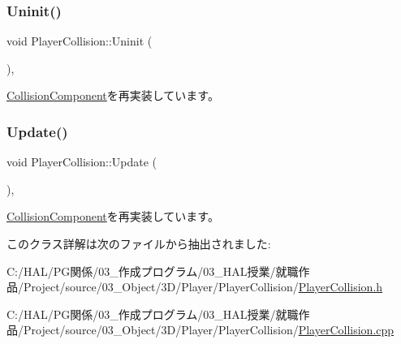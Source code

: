 \mbox{\label{class_player_collision_aa1ab60a62fa2ae3231a1ea0bc8faf801}} 
\subsubsection{\texorpdfstring{Uninit()}{Uninit()}}
{\footnotesize\ttfamily void Player\+Collision\+::\+Uninit (\begin{DoxyParamCaption}{ }\end{DoxyParamCaption})\hspace{0.3cm}{\ttfamily [override]}, {\ttfamily [virtual]}}



\mbox{\hyperlink{class_collision_component_aa75440061f7a60e8c4ee1dae18682cc0}{Collision\+Component}}を再実装しています。

\mbox{\label{class_player_collision_a09f97f220903f5724a3af6b97af3a336}} 
\subsubsection{\texorpdfstring{Update()}{Update()}}
{\footnotesize\ttfamily void Player\+Collision\+::\+Update (\begin{DoxyParamCaption}{ }\end{DoxyParamCaption})\hspace{0.3cm}{\ttfamily [override]}, {\ttfamily [virtual]}}



\mbox{\hyperlink{class_collision_component_a3fa60fd8b4e8690f783c0f578949664e}{Collision\+Component}}を再実装しています。



このクラス詳解は次のファイルから抽出されました\+:\begin{DoxyCompactItemize}
\item 
C\+:/\+H\+A\+L/\+P\+G関係/03\+\_\+作成プログラム/03\+\_\+\+H\+A\+L授業/就職作品/\+Project/source/03\+\_\+\+Object/3\+D/\+Player/\+Player\+Collision/\mbox{\hyperlink{_player_collision_8h}{Player\+Collision.\+h}}\item 
C\+:/\+H\+A\+L/\+P\+G関係/03\+\_\+作成プログラム/03\+\_\+\+H\+A\+L授業/就職作品/\+Project/source/03\+\_\+\+Object/3\+D/\+Player/\+Player\+Collision/\mbox{\hyperlink{_player_collision_8cpp}{Player\+Collision.\+cpp}}\end{DoxyCompactItemize}

